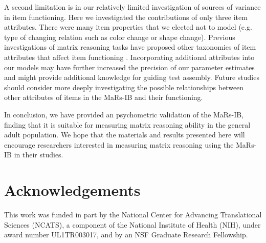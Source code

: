 \documentclass[a4paper,man,natbib]{apa6}
\begin{document}
A second limitation is in our relatively limited investigation of sources of variance in item functioning. Here we investigated the contributions of only three item attributes. There were many item properties that we elected not to model (e.g. type of changing relation such as color change or shape change). Previous investigations of matrix reasoning tasks have proposed other taxonomies of item attributes that affect item functioning \citep{carpenter1990one}. Incorporating additional attributes into our models may have further increased the precision of our parameter estimates and might  provide additional knowledge for guiding test assembly. Future studies should consider more deeply investigating the possible relationships between other attributes of items in the MaRs-IB and their functioning. 

In conclusion, we have provided an psychometric validation of the MaRs-IB, finding that it is suitable for measuring matrix reasoning ability in the general adult population. We hope that the materials and results presented here will encourage researchers interested in measuring matrix reasoning using the MaRs-IB in their studies. 

\section{Acknowledgements}
\noindent This work was funded in part by the National Center for Advancing Translational Sciences (NCATS), a component of the National Institute of Health (NIH), under award number UL1TR003017, and by an NSF Graduate Research Fellowship.


\end{document}
